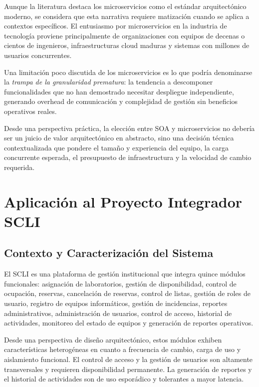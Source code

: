 \documentclass[10pt,twocolumn,letterpaper]{article}
\begin{document}
Aunque la literatura destaca los microservicios como el estándar arquitectónico moderno, se considera que esta narrativa requiere matización cuando se aplica a contextos específicos. El entusiasmo por microservicios en la industria de tecnología proviene principalmente de organizaciones con equipos de decenas o cientos de ingenieros, infraestructuras cloud maduras y sistemas con millones de usuarios concurrentes.

Una limitación poco discutida de los microservicios es lo que podría denominarse la \textit{trampa de la granularidad prematura}: la tendencia a descomponer funcionalidades que no han demostrado necesitar despliegue independiente, generando overhead de comunicación y complejidad de gestión sin beneficios operativos reales.

Desde una perspectiva práctica, la elección entre SOA y microservicios no debería ser un juicio de valor arquitectónico en abstracto, sino una decisión técnica contextualizada que pondere el tamaño y experiencia del equipo, la carga concurrente esperada, el presupuesto de infraestructura y la velocidad de cambio requerida.

\section{Aplicación al Proyecto Integrador SCLI}

\subsection{Contexto y Caracterización del Sistema}

El SCLI es una plataforma de gestión institucional que integra quince módulos funcionales: asignación de laboratorios, gestión de disponibilidad, control de ocupación, reservas, cancelación de reservas, control de listas, gestión de roles de usuario, registro de equipos informáticos, gestión de incidencias, reportes administrativos, administración de usuarios, control de acceso, historial de actividades, monitoreo del estado de equipos y generación de reportes operativos.

Desde una perspectiva de diseño arquitectónico, estos módulos exhiben características heterogéneas en cuanto a frecuencia de cambio, carga de uso y aislamiento funcional. El control de acceso y la gestión de usuarios son altamente transversales y requieren disponibilidad permanente. La generación de reportes y el historial de actividades son de uso esporádico y tolerantes a mayor latencia.
\end{document}
